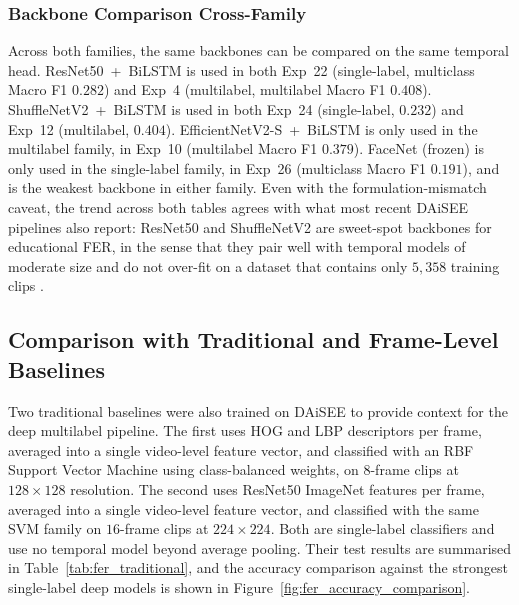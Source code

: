 \subsubsection{Backbone Comparison Cross-Family}\label{sec:results_fer_backbone_cross}

Across both families, the same backbones can be compared on the same temporal head. ResNet50~+~BiLSTM is used in both Exp~22 (single-label, multiclass Macro F1 $0.282$) and Exp~4 (multilabel, multilabel Macro F1 $0.408$). ShuffleNetV2~+~BiLSTM is used in both Exp~24 (single-label, $0.232$) and Exp~12 (multilabel, $0.404$). EfficientNetV2-S~+~BiLSTM is only used in the multilabel family, in Exp~10 (multilabel Macro F1 $0.379$). FaceNet (frozen) is only used in the single-label family, in Exp~26 (multiclass Macro F1 $0.191$), and is the weakest backbone in either family. Even with the formulation-mismatch caveat, the trend across both tables agrees with what most recent DAiSEE pipelines also report: ResNet50 and ShuffleNetV2 are sweet-spot backbones for educational FER, in the sense that they pair well with temporal models of moderate size and do not over-fit on a dataset that contains only $5{,}358$ training clips \cite{abedi_improving_2021,asaju_adaptive_2022,santoni_convolutional_2023,shiri_detection_2024,tulsani_realtime_2025,aly_revolutionizing_2025}.

\subsection{Comparison with Traditional and Frame-Level Baselines}\label{sec:results_fer_traditional}

Two traditional baselines were also trained on DAiSEE to provide context for the deep multilabel pipeline. The first uses HOG and LBP descriptors per frame, averaged into a single video-level feature vector, and classified with an RBF Support Vector Machine using class-balanced weights, on $8$-frame clips at $128 \times 128$ resolution. The second uses ResNet50 ImageNet features per frame, averaged into a single video-level feature vector, and classified with the same SVM family on $16$-frame clips at $224 \times 224$. Both are single-label classifiers and use no temporal model beyond average pooling. Their test results are summarised in Table~\ref{tab:fer_traditional}, and the accuracy comparison against the strongest single-label deep models is shown in Figure~\ref{fig:fer_accuracy_comparison}.

